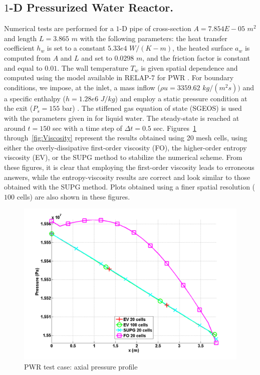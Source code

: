 \subsection{$1$-D Pressurized Water Reactor.} \label{sec:1d-pwr}
Numerical tests are performed for a $1$-D pipe of cross-section $A = 7.854E-05$ $m^2$ and length $L=3.865$ $m$ with the following parameters: the heat transfer coefficient $h_w$ is set to a constant $5.33e4$ $W/(K-m)$, the heated surface $a_w$ is computed from $A$ and $L$ and set to $0.0298$ $m$, and the friction factor is constant and equal to $0.01$. The wall temperature $T_w$ is given spatial dependence and computed using the model available in RELAP-7 for PWR \cite{Relap7PWR}. 
For boundary conditions, we impose, at the inlet, a mass inflow ($\rho u = 3359.62$ $kg/(m^2 s))$ and a specific enthalpy ($h = 1.28e6$ $J/kg$) and employ a static pressure condition at the exit ($P_s = 155$ bar) . The stiffened gas equation of state (SGEOS) is used \cite{SGEOS} with the parameters given in  for liquid water. The steady-state is reached at around $t=150$ sec with a time step of $\Delta t = 0.5$ sec. Figures~\ref{fig:Pressure} through~\ref{fig:Viscosity} represent the results obtained using 20 mesh cells, using either the overly-dissipative first-order viscosity (FO), the higher-order entropy viscosity (EV), or the SUPG \cite{SUPG} method to stabilize the numerical scheme. From these figures, it is clear that employing the first-order viscosity leads to erroneous answers, while the entropy-viscosity results are correct and look similar to those obtained with the SUPG method. Plots obtained using a finer spatial resolution ($100$ cells) are also shown in these figures.
%
\begin{figure}[H]
\centering
\includegraphics[width=\textwidth]{figures/PWR_stt_pressure.png}
\caption{PWR test case: axial pressure profile}
\label{fig:Pressure}
\end{figure}
